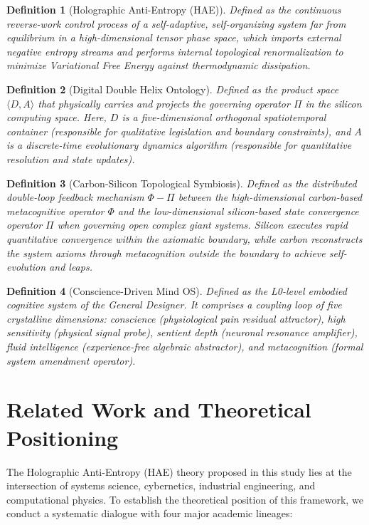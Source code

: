 \documentclass[11pt,a4paper]{article}
\newtheorem{definition}{Definition}[section]
\begin{document}
\begin{definition}[Holographic Anti-Entropy (HAE)]
Defined as the continuous reverse-work control process of a self-adaptive, self-organizing system far from equilibrium in a high-dimensional tensor phase space, which imports external negative entropy streams and performs internal topological renormalization to minimize Variational Free Energy against thermodynamic dissipation.
\end{definition}

\begin{definition}[Digital Double Helix Ontology]
Defined as the product space $\langle D, A \rangle$ that physically carries and projects the governing operator $\Pi$ in the silicon computing space. Here, $D$ is a five-dimensional orthogonal spatiotemporal container (responsible for qualitative legislation and boundary constraints), and $A$ is a discrete-time evolutionary dynamics algorithm (responsible for quantitative resolution and state updates).
\end{definition}

\begin{definition}[Carbon-Silicon Topological Symbiosis]
Defined as the distributed double-loop feedback mechanism $\Phi - \Pi$ between the high-dimensional carbon-based metacognitive operator $\Phi$ and the low-dimensional silicon-based state convergence operator $\Pi$ when governing open complex giant systems. Silicon executes rapid quantitative convergence within the axiomatic boundary, while carbon reconstructs the system axioms through metacognition outside the boundary to achieve self-evolution and leaps.
\end{definition}

\begin{definition}[Conscience-Driven Mind OS]
Defined as the L0-level embodied cognitive system of the General Designer. It comprises a coupling loop of five crystalline dimensions: conscience (physiological pain residual attractor), high sensitivity (physical signal probe), sentient depth (neuronal resonance amplifier), fluid intelligence (experience-free algebraic abstractor), and metacognition (formal system amendment operator).
\end{definition}

\section{Related Work and Theoretical Positioning}
The Holographic Anti-Entropy (HAE) theory proposed in this study lies at the intersection of systems science, cybernetics, industrial engineering, and computational physics. To establish the theoretical position of this framework, we conduct a systematic dialogue with four major academic lineages:
\end{document}
